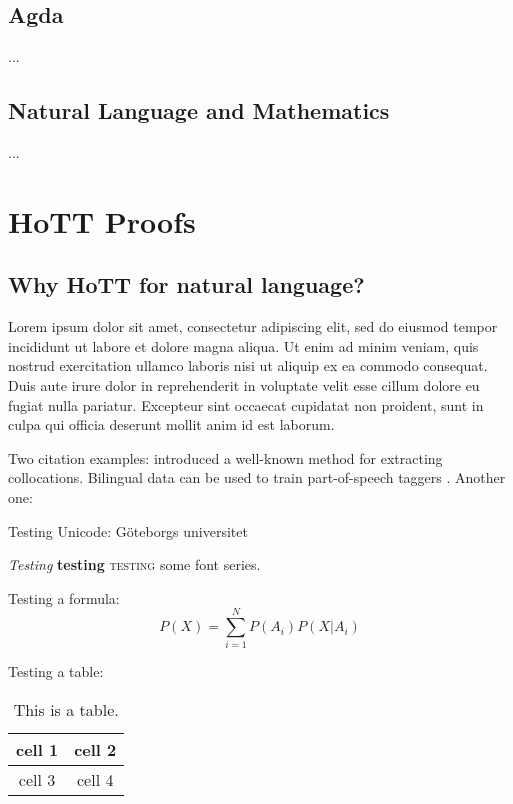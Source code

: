 \documentclass[11pt, a4paper]{article}
\begin{document}
\subsection{Agda}

...

\subsection{Natural Language and Mathematics}

...

\section{HoTT Proofs}

\subsection{Why HoTT for natural language?}



Lorem ipsum dolor sit amet, consectetur adipiscing elit, sed do eiusmod tempor incididunt ut labore et dolore magna aliqua. Ut enim ad minim veniam, quis nostrud exercitation ullamco laboris nisi ut aliquip ex ea commodo consequat. Duis aute irure dolor in reprehenderit in voluptate velit esse cillum dolore eu fugiat nulla pariatur. Excepteur sint occaecat cupidatat non proident, sunt in culpa qui officia deserunt mollit anim id est laborum.

Two citation examples: 
\cite{dunning1993} introduced a well-known method for extracting
collocations. Bilingual data can be used to train part-of-speech
taggers \citep{das2011}. Another one: \citep{cortes2014}

Testing Unicode: Göteborgs universitet

\textit{Testing} \textbf{testing} \textsc{testing} some font series.

Testing a formula:
\[
P(X) = \sum_{i=1}^N P(A_i) P(X|A_i)
\]

Testing a table:
\begin{table}[htbp]
\begin{center}
\begin{tabular}{c|c}
cell 1 & cell 2 \\
\hline
cell 3 & cell 4
\end{tabular}
\caption{This is a table.}
\end{center}
\end{table}

\newpage
\end{document}
